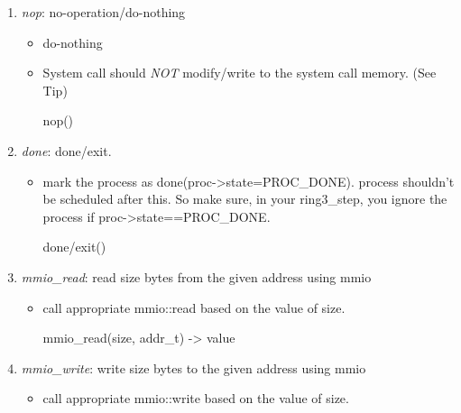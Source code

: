 \documentclass[]{article}
\newenvironment{Shaded}{}{}
\newcommand{\NormalTok}[1]{{#1}}
\providecommand{\tightlist}{%
  \setlength{\itemsep}{0pt}\setlength{\parskip}{0pt}}
\begin{document}
\begin{enumerate}
\def\labelenumi{\arabic{enumi}.}
\setcounter{enumi}{-1}
\tightlist
\item
  \emph{nop}: no-operation/do-nothing

  \begin{itemize}
  \item
    do-nothing
  \item
    System call should \emph{NOT} modify/write to the system call
    memory. (See Tip)

\begin{Shaded}
\begin{Highlighting}[]
\NormalTok{nop()}
\end{Highlighting}
\end{Shaded}
  \end{itemize}
\item
  \emph{done}: done/exit.

  \begin{itemize}
  \item
    mark the process as done(proc-\textgreater{}state=PROC\_DONE).
    process shouldn't be scheduled after this. So make sure, in your
    ring3\_step, you ignore the process if
    proc-\textgreater{}state==PROC\_DONE.

\begin{Shaded}
\begin{Highlighting}[]
\NormalTok{done/exit()}
\end{Highlighting}
\end{Shaded}
  \end{itemize}
\item
  \emph{mmio\_read}: read size bytes from the given address using mmio

  \begin{itemize}
  \item
    call appropriate mmio::read based on the value of size.

\begin{Shaded}
\begin{Highlighting}[]
\NormalTok{mmio_read(size, addr_t) -> value}
\end{Highlighting}
\end{Shaded}
  \end{itemize}
\item
  \emph{mmio\_write}: write size bytes to the given address using mmio

  \begin{itemize}
  \item
    call appropriate mmio::write based on the value of size.


\end{itemize}
\end{enumerate}
\end{document}
